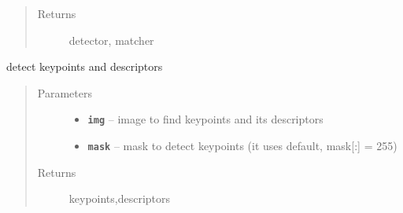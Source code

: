 \documentclass[letterpaper,10pt,english]{sphinxmanual}
\begin{document}
\begin{fulllineitems}
\begin{fulllineitems}
\begin{quote}
\begin{description}
\begin{itemize}
\end{itemize}

\item[{Returns}] \leavevmode
detector, matcher

\end{description}\end{quote}

\end{fulllineitems}


\begin{fulllineitems}
\label{RRtoolbox.lib:RRtoolbox.lib.descriptors.Feature.detectAndCompute}
detect keypoints and descriptors
\begin{quote}\begin{description}
\item[{Parameters}] \leavevmode\begin{itemize}
\item {} 
\textbf{\texttt{img}} -- image to find keypoints and its descriptors

\item {} 
\textbf{\texttt{mask}} -- mask to detect keypoints (it uses default, mask{[}:{]} = 255)

\end{itemize}

\item[{Returns}] \leavevmode
keypoints,descriptors

\end{description}\end{quote}

\end{fulllineitems}


\end{fulllineitems}

\end{document}
